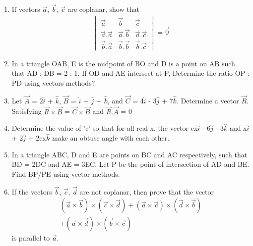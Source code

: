 \begin{enumerate}[label=\arabic*.,ref=\thesubsection.\theenumi]
\item If vectors $\overrightarrow{a}$, $\overrightarrow{b}$, $\overrightarrow{c}$ are coplanar, show that
\begin{align*}
\begin{vmatrix}
\overrightarrow{a} & \overrightarrow{b} & \overrightarrow{c} \\ 
\overrightarrow{a} . \overrightarrow{a} & \overrightarrow{a} . \overrightarrow{b} & \overrightarrow{a} . \overrightarrow{c} \\ 
\overrightarrow{b} . \overrightarrow{a} & \overrightarrow{b} . \overrightarrow{b} & \overrightarrow{b} . \overrightarrow{c}
\end{vmatrix} = \overrightarrow{0}
\end{align*}

\item In a triangle OAB, E is the midpoint of BO and D is a point on AB such that AD : DB = 2 : 1. If OD and AE intersect at P, Determine the ratio OP : PD using vectors methods?

\item Let $\overrightarrow{A}$ = 2$\hat{i}$ + $\hat{k}$, $\overrightarrow{B}$ = $\hat{i}$ + $\hat{j}$ + $\hat{k}$, and 
$\overrightarrow{C}$ = 4$\hat{i}$ - 3$\hat{j}$ + 7$\hat{k}$. Determine a vector $\overrightarrow{R}$. Satisfying 
$\overrightarrow{R} \times \overrightarrow{B}$ = $\overrightarrow{C} \times \overrightarrow{B}$ and $\overrightarrow{R}.\overrightarrow{A}$ = 0

\item Determine the value of 'c' so that for all real x, the vector cx$\hat{i}$ - 6$\hat{j}$ - 3$\hat{k}$ and 
x$\hat{i}$ + 2$\hat{j}$ + 2cx$\hat{k}$ make an obtuse angle with each other.

\item In a triangle ABC, D and E are points on BC and AC respectively, such that BD = 2DC and AE = 3EC. Let P be the point of intersection of AD and BE. Find BP/PE using vector methods.

\item If the vectors $\overrightarrow{b}$, $\overrightarrow{c}$, $\overrightarrow{d}$ are not coplanar, then prove that the vector
\begin{align*}
(\overrightarrow{a} \times \overrightarrow{b}) \times (\overrightarrow{c} \times \overrightarrow{d}) + (\overrightarrow{a} \times \overrightarrow{c}) \times (\overrightarrow{d} \times \overrightarrow{b})\\ + 
(\overrightarrow{a} \times \overrightarrow{d}) \times (\overrightarrow{b} \times \overrightarrow{c})
\end{align*}
is parallel to $\overrightarrow{a}$.


\end{enumerate}
